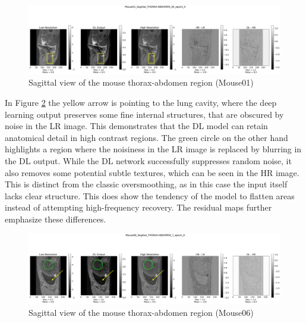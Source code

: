 \documentclass[twocolumn]{article}
\begin{document}
\begin{figure}
    \centering
    \includegraphics[width=1\linewidth]{Mouse01_Sagittal_val.png}
    \caption{Sagittal view of the mouse thorax-abdomen region (Mouse01)}
    \label{fig:val_1}
\end{figure}


In Figure \ref{fig:val_2} the yellow arrow is pointing to the lung cavity, where the deep learning output preserves some fine internal structures,
that are obscured by noise in the LR image. This demonstrates that the DL model can retain anatomical detail in high contrast regions. 
The green circle on the other hand highlights a region where the noisiness in the LR image is replaced by blurring in the DL output. 
While the DL network successfully suppresses random noise, it also removes some potential subtle textures, which can be seen in the HR image. 
This is distinct from the classic oversmoothing, as in this case the input itself lacks clear structure. 
This does show the tendency of the model to flatten areas instead of attempting high-frequency recovery.
The residual maps further emphasize these differences.

\begin{figure}
    \centering
    \includegraphics[width=1\linewidth]{Mouse06_Sagittal_val.png}
    \caption{Sagittal view of the mouse thorax-abdomen region (Mouse06)}
    \label{fig:val_2}
\end{figure}
\end{document}
